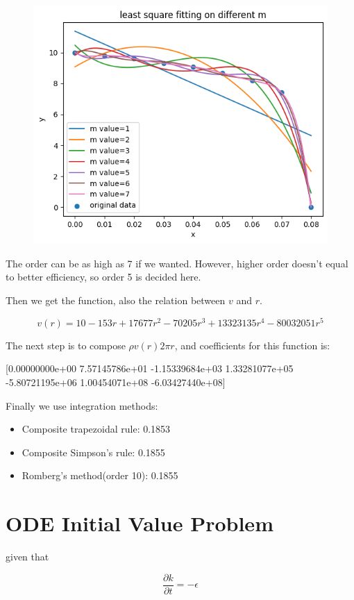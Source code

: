 \documentclass[conference]{IEEEtran}
\begin{document}
\begin{figure}[htbp]
	\centerline{\includegraphics[width=0.9\columnwidth]{1-2.png}}
\end{figure}

The order can be as high as 7 if we wanted.
However, higher order doesn't equal to better efficiency, so order 5 is decided here.

Then we get the function, also the relation between $v$ and $r$.

$$
v(r) = 10 - 153r + 17677r^2 -70205r^3 + 13323135r^4 -80032051r^5 
$$

The next step is to compose $\rho v(r)2 \pi r$,
and coefficients for this function is:

[0.00000000e+00  7.57145786e+01 -1.15339684e+03  1.33281077e+05
-5.80721195e+06  1.00454071e+08 -6.03427440e+08]

Finally we use integration methods:
\begin{itemize}
	\item Composite trapezoidal rule: 0.1853
	\item Composite Simpson's rule: 0.1855
	\item Romberg's method(order 10): 0.1855 
\end{itemize}

\section{ODE Initial Value Problem}

given that

$$
\frac{\partial k}{\partial t} = -\epsilon
$$
\end{document}

